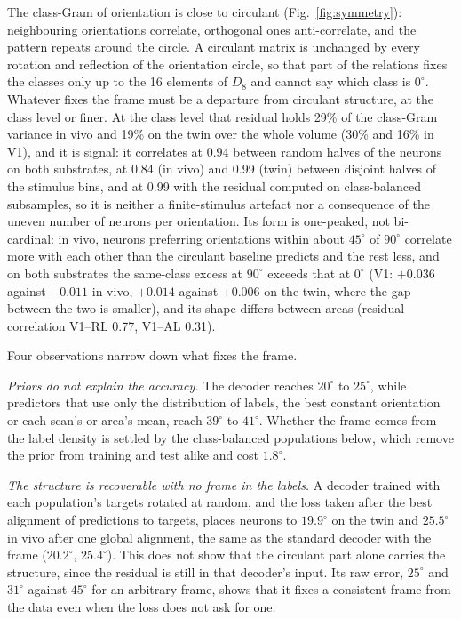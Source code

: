 \documentclass[11pt]{article}
\begin{document}
The class-Gram of orientation is close to circulant (Fig.~\ref{fig:symmetry}): neighbouring orientations correlate, orthogonal ones anti-correlate, and the pattern repeats around the circle. A circulant matrix is unchanged by every rotation and reflection of the orientation circle, so that part of the relations fixes the classes only up to the 16 elements of $D_8$ and cannot say which class is $0^\circ$. Whatever fixes the frame must be a departure from circulant structure, at the class level or finer. At the class level that residual holds 29\% of the class-Gram variance in vivo and 19\% on the twin over the whole volume (30\% and 16\% in V1), and it is signal: it correlates at 0.94 between random halves of the neurons on both substrates, at 0.84 (in vivo) and 0.99 (twin) between disjoint halves of the stimulus bins, and at 0.99 with the residual computed on class-balanced subsamples, so it is neither a finite-stimulus artefact nor a consequence of the uneven number of neurons per orientation. Its form is one-peaked, not bi-cardinal: in vivo, neurons preferring orientations within about $45^\circ$ of $90^\circ$ correlate more with each other than the circulant baseline predicts and the rest less, and on both substrates the same-class excess at $90^\circ$ exceeds that at $0^\circ$ (V1: $+0.036$ against $-0.011$ in vivo, $+0.014$ against $+0.006$ on the twin, where the gap between the two is smaller), and its shape differs between areas (residual correlation V1--RL 0.77, V1--AL 0.31).

Four observations narrow down what fixes the frame.

\emph{Priors do not explain the accuracy.} The decoder reaches $20^\circ$ to $25^\circ$, while predictors that use only the distribution of labels, the best constant orientation or each scan's or area's mean, reach $39^\circ$ to $41^\circ$. Whether the frame comes from the label density is settled by the class-balanced populations below, which remove the prior from training and test alike and cost $1.8^\circ$.

\emph{The structure is recoverable with no frame in the labels.} A decoder trained with each population's targets rotated at random, and the loss taken after the best alignment of predictions to targets, places neurons to $19.9^\circ$ on the twin and $25.5^\circ$ in vivo after one global alignment, the same as the standard decoder with the frame ($20.2^\circ$, $25.4^\circ$). This does not show that the circulant part alone carries the structure, since the residual is still in that decoder's input. Its raw error, $25^\circ$ and $31^\circ$ against $45^\circ$ for an arbitrary frame, shows that it fixes a consistent frame from the data even when the loss does not ask for one.
\end{document}
